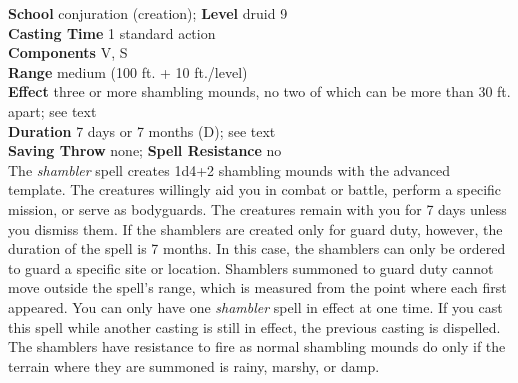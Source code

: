 \textbf{School} conjuration (creation); \textbf{Level} druid 9\\
\textbf{Casting Time} 1 standard action\\
\textbf{Components} V, S\\
\textbf{Range }medium (100 ft. + 10 ft./level)\\
\textbf{Effect} three or more shambling mounds, no two of which can be more than 30 ft. apart; see text\\
\textbf{Duration} 7 days or 7 months (D); see text\\
\textbf{Saving Throw} none; \textbf{Spell Resistance} no\\
The \textit{shambler }spell creates 1d4+2 shambling mounds with the advanced template. The creatures willingly aid you in combat or battle, perform a specific mission, or serve as bodyguards. The creatures remain with you for 7 days unless you dismiss them. If the shamblers are created only for guard duty, however, the duration of the spell is 7 months. In this case, the shamblers can only be ordered to guard a specific site or location. Shamblers summoned to guard duty cannot move outside the spell's range, which is measured from the point where each first appeared. You can only have one \textit{shambler} spell in effect at one time. If you cast this spell while another casting is still in effect, the previous casting is dispelled. The shamblers have resistance to fire as normal shambling mounds do only if the terrain where they are summoned is rainy, marshy, or damp.\\
